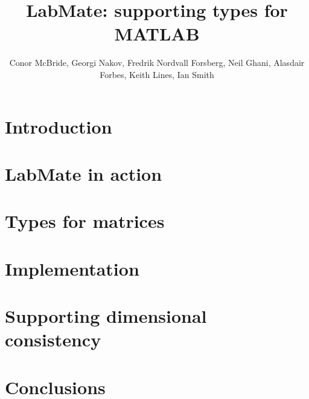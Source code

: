 \documentclass{ws-procs9x6}
\begin{document}
\title{LabMate: supporting types for MATLAB}
\author{Conor McBride, Georgi Nakov, Fredrik Nordvall Forsberg, Neil Ghani, Alasdair Forbes, Keith Lines, Ian Smith}
\address{University of Strathclyde, National Physical Laboratory}

\bodymatter

\section{Introduction}





\section{LabMate in action}


\section{Types for matrices}



\section{Implementation}




\section{Supporting dimensional consistency}


\section{Conclusions}




%
\end{document}
